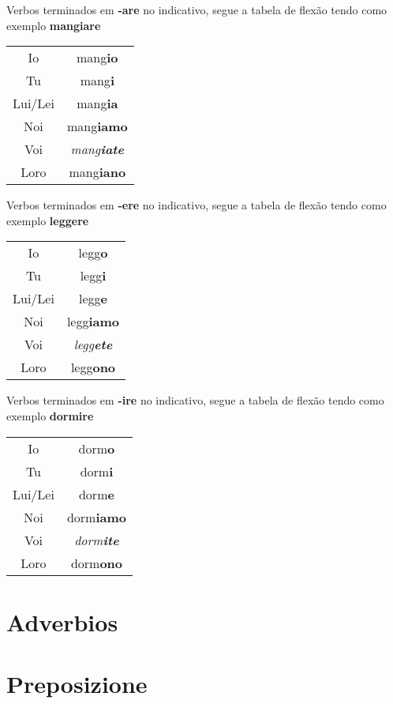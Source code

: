Verbos terminados em \textbf{-are} no indicativo, segue a tabela de flexão tendo como exemplo \textbf{mangiare}
\begin{tabular}{cc}
Io&mang\textbf{io}\\
Tu&mang\textbf{i}\\
Lui/Lei&mang\textbf{ia}\\
Noi&mang\textbf{iamo}\\
Voi&\textit{mang\textbf{iate}}\\
Loro&mang\textbf{iano}\\
\end{tabular}


Verbos terminados em \textbf{-ere} no indicativo, segue a tabela de flexão tendo como exemplo \textbf{leggere}
\begin{tabular}{cc}
	Io&legg\textbf{o}\\
	Tu&legg\textbf{i}\\
	Lui/Lei&legg\textbf{e}\\
	Noi&legg\textbf{iamo}\\
	Voi&\textit{legg\textbf{ete}}\\
	Loro&legg\textbf{ono}\\
\end{tabular}


Verbos terminados em \textbf{-ire} no indicativo, segue a tabela de flexão tendo como exemplo \textbf{dormire}
\begin{tabular}{cc}
	Io&dorm\textbf{o}\\
	Tu&dorm\textbf{i}\\
	Lui/Lei&dorm\textbf{e}\\
	Noi&dorm\textbf{iamo}\\
	Voi&\textit{dorm\textbf{ite}}\\
	Loro&dorm\textbf{ono}\\
\end{tabular}

\section{Adverbios}
\section{Preposizione}
